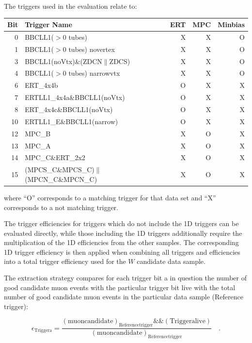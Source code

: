 The triggers used in the evaluation relate to:
\begin{center}
\begin{tabular}{r|l| r | r | r}
  \toprule
  \textbf{Bit} & 
  \textbf{Trigger Name} & 
  \textbf{ERT} & 
  \textbf{MPC} & 
  \textbf{Minbias} \\ 
  \midrule
      0 & BBCLL1($>$0 tubes)  & X & X & O\\
       1 & BBCLL1($>$0 tubes) novertex  & X & X & O\\
       3 & BBCLL1(noVtx)\&(ZDCN$\|$ZDCS) & X & X & O\\
       4 & BBCLL1($>$0 tubes) narrowvtx & X & X & O\\
       6 & ERT\_4x4b & O & X & X\\
       7 & ERTLL1\_4x4a\&BBCLL1(noVtx) & O & X & X\\
       8 & ERT\_4x4c\&BBCLL1(noVtx) & O & X & X\\
      10 & ERTLL1\_E\&BBCLL1(narrow) & O & X & X\\
      12 & MPC\_B & X & O & X\\
      13 & MPC\_A & X & O & X\\
      14 & MPC\_C\&ERT\_2x2 & X & O & X\\
      15 & (MPCS\_C\&MPCS\_C)$\|$(MPCN\_C\&MPCN\_C) & X & O & X\\ 
  \bottomrule
  \end{tabular}
\end{center}

{\noindent}where ``O'' corresponds to a matching trigger for that data set and
``X'' corresponds to a not matching trigger.

The trigger efficiencies for triggers which do not include the 1D triggers can
be evaluated directly, while those including the 1D triggers additionally
require the multiplication of the 1D efficiencies from the other samples. The
corresponding 1D trigger efficiency is then applied when combining all triggers
and efficiencies into a total trigger efficiency used for the $W$ candidate data
sample. 

The extraction strategy compares for each trigger bit a in question
the number of good candidate muon events with the particular trigger bit live
with the total number of good candidate muon events in the particular data
sample (Reference trigger):

\begin{equation}
\epsilon_{\mathrm{Trigger a}} = \frac{(\mathrm{muon candidate})_{\mathrm{Reference trigger}} \&\& (\mathrm{Trigger a live}) }{(\mathrm{muon candidate})_{\mathrm{Reference trigger}}}\quad.
\end{equation}

